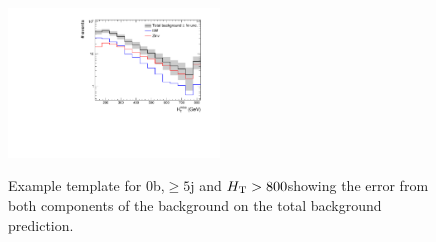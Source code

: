 \begin{figure}[h!]
  \centering
  \includegraphics[width=0.5\textwidth]{figures/template/exampleTemplate13TeV.pdf}
  \\
  \caption{\label{fig:exampleTemplate13} Example template for 0b,$\ge5$j and $\scalht > 800$\GeV showing the error from both
components of the background on the total background prediction.}
  
\end{figure}

%
%

